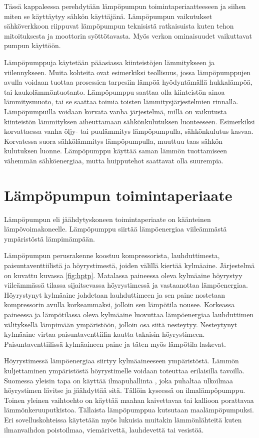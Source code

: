 Tässä kappaleessa perehdytään lämpöpumpun toimintaperiaatteeseen ja siihen miten se käyttäytyy sähkön käyttäjänä. Lämpöpumpun vaikutukset sähköverkkoon riippuvat lämpöpumpun teknisistä ratkaisuista kuten tehon mitoituksesta ja moottorin syöttötavasta. Myös verkon ominaisuudet vaikuttavat pumpun käyttöön.

Lämpöpumppuja käytetään pääasiassa kiinteistöjen lämmitykseen ja viilennykseen. Muita kohteita ovat esimerkiksi teollisuus, jossa lämpöpumppujen avulla voidaan tuottaa prosessien tarpesiin lämpöä hyödyntämällä hukkalämpöä, tai kaukolämmöntuotanto.\parencite{Setala, katriVala} Lämpöpumppu saattaa olla kiinteistön ainoa lämmitysmuoto, tai se saattaa toimia toisten lämmitysjärjestelmien rinnalla. Lämpöpumpuilla voidaan korvata vanha järjestelmä, millä on vaikutusta kiinteistön lämmityksen aiheuttamaan sähkönkulutuksen luonteeseen. Esimerkiksi korvattaessa vanha öljy- tai puulämmitys lämpöpumpulla, sähkönkulutus kasvaa. Korvatessa suora sähkölämmitys lämpöpumpulla, muuttuu taas sähkön kulutuksen luonne. Lämpöpumppu käyttää saman lämmön tuottamiseen vähemmän sähköenergiaa, mutta huipputehot saattavat olla suurempia.

\section{Lämpöpumpun toimintaperiaate}
  Lämpöpumpun eli jäähdytyskoneen toimintaperiaate on käänteinen lämpövoimakoneelle. Lämpöpumppu siirtää lämpöenergiaa viileämmästä ympäristöstä lämpimämpään.\parencite{DincerRosen}

  Lämpöpumpun perusrakenne koostuu kompressorista, lauhduttimesta, paisuntaventtiilistä ja höyrystimestä, joiden välillä kiertää kylmäaine. Järjestelmä on kuvattu kuvassa \ref{fig:hptp}. Matalassa paineessa oleva kylmäaine höyrystyy viileämmässä tilassa sijaitsevassa höyrystimessä ja vastaanottaa lämpöenergiaa. Höyrystynyt kylmäaine johdetaan lauhduttimeen ja sen paine nostetaan kompressorin avulla korkeammaksi, jolloin sen lämpötila nousee. Korkeassa paineessa ja lämpötilassa oleva kylmäaine luovuttaa lämpöenergiaa lauhduttimen välityksellä lämpimään ympäristöön, jolloin osa siitä nesteytyy. Nesteytynyt kylmäaine virtaa paisuntaventtiilin kautta takaisin höyrystimeen. Paisuntaventtiilissä kylmäaineen paine ja täten myös lämpötila laskevat.\parencite{DincerRosen}

  Höyrystimessä lämpöenergiaa siirtyy kylmäaineeseen ympäristöstä. Lämmön kuljettaminen ympäristöstä höyrystimelle voidaan toteuttaa erilaisilla tavoilla. Suomessa yleisin tapa on käyttää ilmapuhallinta , joka puhaltaa ulkoilmaa höyrystimen lävitse ja jäähdyttää sitä. Tällöin kyseessä on ilmalämpöpumppu. Toinen yleinen vaihtoehto on käyttää maahan kaivettavaa tai kallioon porattavaa lämmönkeruuputkistoa. Tällaista lämpöpumppua kutsutaan maalämpöpumpuksi. Eri sovelluskohteissa käytetään myös lukuisia muitakin lämmönlähteitä kuten ilmanvaihdon poistoilmaa, viemärivettä, lauhdevettä tai vesistöä.\parencite{DincerRosen}

